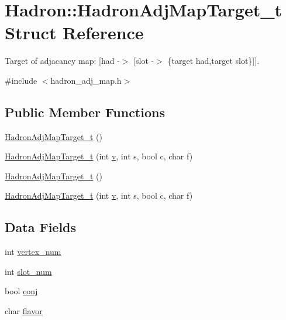 \hypertarget{structHadron_1_1HadronAdjMapTarget__t}{}\section{Hadron\+:\+:Hadron\+Adj\+Map\+Target\+\_\+t Struct Reference}
\label{structHadron_1_1HadronAdjMapTarget__t}


Target of adjacancy map\+: \mbox{[}had -\/$>$ \mbox{[}slot -\/$>$ \{target had,target slot\}\mbox{]}\mbox{]}.  




{\ttfamily \#include $<$hadron\+\_\+adj\+\_\+map.\+h$>$}

\subsection*{Public Member Functions}
\begin{DoxyCompactItemize}
\item 
\mbox{\hyperlink{structHadron_1_1HadronAdjMapTarget__t_a63044628e349d5fdd35356c36d3e2bf3}{Hadron\+Adj\+Map\+Target\+\_\+t}} ()
\item 
\mbox{\hyperlink{structHadron_1_1HadronAdjMapTarget__t_a97e4ef040c8656ca5a431fd88d5f3b56}{Hadron\+Adj\+Map\+Target\+\_\+t}} (int \mbox{\hyperlink{hadron__timeslice_8cc_a716fc87f5e814be3ceee2405ed6ff22a}{v}}, int s, bool c, char f)
\item 
\mbox{\hyperlink{structHadron_1_1HadronAdjMapTarget__t_a63044628e349d5fdd35356c36d3e2bf3}{Hadron\+Adj\+Map\+Target\+\_\+t}} ()
\item 
\mbox{\hyperlink{structHadron_1_1HadronAdjMapTarget__t_a97e4ef040c8656ca5a431fd88d5f3b56}{Hadron\+Adj\+Map\+Target\+\_\+t}} (int \mbox{\hyperlink{hadron__timeslice_8cc_a716fc87f5e814be3ceee2405ed6ff22a}{v}}, int s, bool c, char f)
\end{DoxyCompactItemize}
\subsection*{Data Fields}
\begin{DoxyCompactItemize}
\item 
int \mbox{\hyperlink{structHadron_1_1HadronAdjMapTarget__t_a591e79f978fc68efa83b729d13e6872c}{vertex\+\_\+num}}
\item 
int \mbox{\hyperlink{structHadron_1_1HadronAdjMapTarget__t_a59cc83d2da52e974a06d4ae8dc8b1468}{slot\+\_\+num}}
\item 
bool \mbox{\hyperlink{structHadron_1_1HadronAdjMapTarget__t_ab0dc7d35e65a5bf062eebe45f56ca135}{conj}}
\item 
char \mbox{\hyperlink{structHadron_1_1HadronAdjMapTarget__t_a649624915499cdf922a11d0df23e1aa0}{flavor}}
\end{DoxyCompactItemize}


